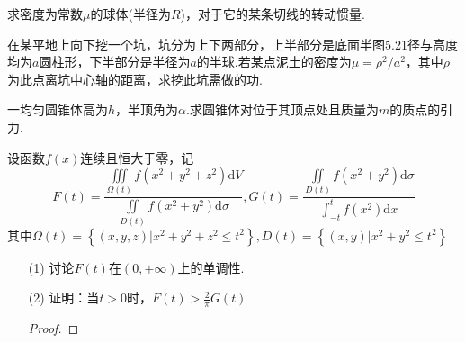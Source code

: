 \begin{xiti}
	\item 求密度为常数$\mu $的球体(半径为$R$)，对于它的某条切线的转动惯量.
	\begin{solution}
	\end{solution}
	
	\item 在某平地上向下挖一个坑，坑分为上下两部分，上半部分是底面半图5.21径与高度均为$a$圆柱形，下半部分是半径为$a$的半球.若某点泥土的密度为$ \mu=\rho^{2} / a^{2}$，其中$\rho$为此点离坑中心轴的距离，求挖此坑需做的功.
	\begin{solution}
	\end{solution}
	
	\item 一均匀圆锥体高为$h$，半顶角为$\alpha$.求圆锥体对位于其顶点处且质量为$m$的质点的引力.
	\begin{solution}
	\end{solution}
	
	\item 设函数$f(x)$连续且恒大于零，记
	\[
	F\left(t\right)=\frac{\iiint\limits_{\Omega\left(t\right)}{f\left(x^2+y^2+z^2\right)\textrm{d}V}}{\iint\limits_{D\left(t\right)}{f\left(x^2+y^2\right)\textrm{d}\sigma}},G\left(t\right)=\frac{\iint\limits_{D\left(t\right)}{f\left(x^2+y^2\right)\textrm{d}\sigma}}{\int_{-t}^t{f\left(x^2\right)\textrm{d}x}}
	\]
	其中$
	\Omega(t)=\left\{(x, y, z) | x^{2}+y^{2}+z^{2} \leqslant t^{2}\right\}, D(t)=\left\{(x, y) | x^{2}+y^{2} \leqslant t^{2}\right\}$
	\begin{enumerate}
		\item [(1)]讨论$F(t)$在$(0,+\infty)$上的单调性.
		\begin{solution}
		\end{solution}
		
		\item [(2)]证明：当$t>0$时，$F(t)>\frac{2}{\pi} G(t)$
		\begin{proof}
		\end{proof}
		
	\end{enumerate}
\end{xiti}


